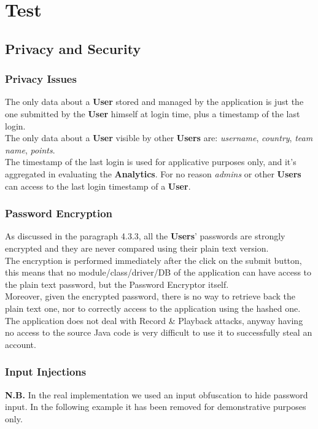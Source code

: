 \section{Test}
\subsection{Privacy and Security}
\subsubsection{Privacy Issues}
The only data about a \textbf{User} stored and managed by the application is just the one submitted by the \textbf{User} himself at login time, plus a timestamp of the last login.\\
The only data about a \textbf{User} visible by other \textbf{Users} are: \textit{username}, \textit{country}, \textit{team name}, \textit{points}. \\
The timestamp of the last login is used for applicative purposes only, and it’s aggregated in evaluating the \textbf{Analytics}. For no reason \textit{admins} or other \textbf{Users} can access to the last login timestamp of a \textbf{User}.
\subsubsection{Password Encryption}
As discussed in the paragraph 4.3.3, all the \textbf{Users}’ passwords are strongly encrypted and they are never compared using their plain text version. \\
The encryption is performed immediately after the click on the submit button, this means that no module/class/driver/DB of the application can have access to the plain text password, but the Password Encryptor itself.\\
Moreover, given the encrypted password, there is no way to retrieve back the plain text one, nor to correctly access to the application using the hashed one.\\
The application does not deal with Record \& Playback attacks, anyway having no access to the source Java code is very difficult to use it to successfully steal an account.
\subsubsection{Input Injections}
\textbf{N.B.} In the real implementation we used an input obfuscation to hide password input. In the following example it has been removed for demonstrative purposes only.

